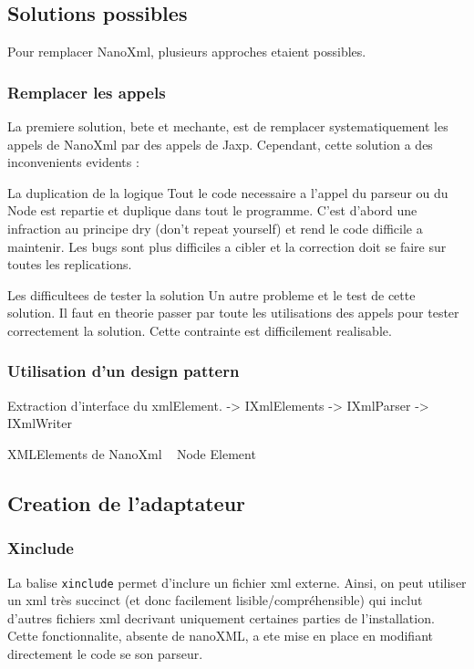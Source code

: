 \subsection{Solutions possibles}
Pour remplacer NanoXml, plusieurs approches etaient possibles. 
\subsubsection{Remplacer les appels}
La premiere solution, bete et mechante, est de remplacer systematiquement les appels de NanoXml par des appels de Jaxp. Cependant, cette solution a des inconvenients evidents :
\begin{list}
\item[La duplication de la logique] Tout le code necessaire a l'appel du parseur ou du Node est repartie et duplique dans tout le programme. C'est d'abord une infraction au principe dry (don't repeat yourself) et rend le code difficile a maintenir. Les bugs sont plus difficiles a cibler et la correction doit se faire sur toutes les replications.
\item[Les difficultees de tester la solution] Un autre probleme et le test de cette solution. Il faut en theorie passer par toute les utilisations des appels pour tester correctement la solution. Cette contrainte est difficilement realisable.
\item[]
\end{list}
\subsubsection{Utilisation d'un design pattern}
Extraction d'interface du xmlElement.
-> IXmlElements
-> IXmlParser
-> IXmlWriter

XMLElements de NanoXml ~ Node Element
\subsection{Creation de l'adaptateur}
\subsubsection{Xinclude}
La balise \verb|xinclude| permet d'inclure un fichier xml externe. Ainsi, on peut utiliser un xml très succinct (et donc facilement lisible/compréhensible) qui inclut d'autres fichiers xml decrivant uniquement certaines parties de l'installation. Cette fonctionnalite, absente de nanoXML, a ete mise en place en modifiant directement le code se son parseur.


